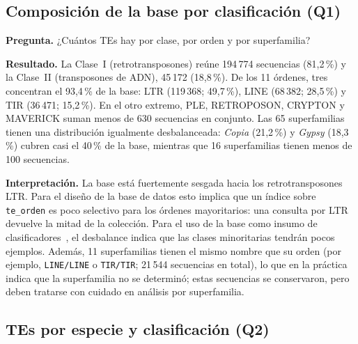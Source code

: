 
\subsection*{Composición de la base por clasificación (Q1)}

\textbf{Pregunta.} ¿Cuántos TEs hay por clase, por orden y por superfamilia?

\textbf{Resultado.} La Clase~I (retrotransposones) reúne 194\,774 secuencias
(81,2\,\%) y la Clase~II (transposones de ADN), 45\,172 (18,8\,\%). De los
11 órdenes, tres concentran el 93,4\,\% de la base: LTR (119\,368; 49,7\,\%),
LINE (68\,382; 28,5\,\%) y TIR (36\,471; 15,2\,\%). En el otro extremo,
PLE, RETROPOSON, CRYPTON y MAVERICK suman menos de 630 secuencias en
conjunto. Las 65 superfamilias tienen una distribución igualmente
desbalanceada: \textit{Copia} (21,2\,\%) y \textit{Gypsy} (18,3\,\%) cubren
casi el 40\,\% de la base, mientras que 16 superfamilias tienen menos de
100 secuencias.

\textbf{Interpretación.} La base está fuertemente sesgada hacia los
retrotransposones LTR. Para el diseño de la base de datos esto implica que
un índice sobre \texttt{te\_orden} es poco selectivo para los órdenes
mayoritarios: una consulta por LTR devuelve la mitad de la colección. Para
el uso de la base como insumo de clasificadores~\cite{orozcoarias2026panteon},
el desbalance indica que las clases minoritarias tendrán pocos ejemplos.
Además, 11 superfamilias tienen el mismo nombre que su orden (por ejemplo,
\texttt{LINE/LINE} o \texttt{TIR/TIR}; 21\,544 secuencias en total), lo que
en la práctica indica que la superfamilia no se determinó; estas secuencias
se conservaron, pero deben tratarse con cuidado en análisis por superfamilia.

\subsection*{TEs por especie y clasificación (Q2)}

